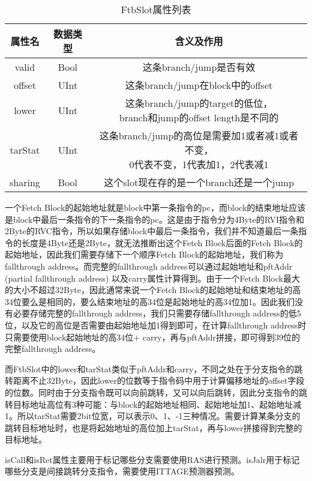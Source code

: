 \begin{table}[]
	\caption{FtbSlot属性列表}
	\label{tb:table2}
	\centering
	\begin{tabular}{|c|c|c|}
		\hline
		属性名   & 数据类型   & 含义及作用   \\ \hline
		valid & Bool & 这条branch/jump是否有效 \\ \hline
		offset & UInt & 这条branch/jump在block中的offset \\ \hline
		lower & UInt & \tabincell{c}{这条branch/jump的target的低位， \\ branch和jump的offset length是不同的} \\ \hline
		tarStat & UInt & \tabincell{c}{这条branch/jump的高位是需要加1或者减1或者不变， \\ 0代表不变，1代表加1，2代表减1} \\ \hline
		sharing & Bool & 这个slot现在存的是一个branch还是一个jump \\ \hline
	\end{tabular}
\end{table}

一个Fetch Block的起始地址就是block中第一条指令的pc，而block的结束地址应该是block中最后一条指令的下一条指令的pc。这是由于指令分为4Byte的RVI指令和2Byte的RVC指令，所以如果存储block中最后一条指令，我们并不知道最后一条指令的长度是4Byte还是2Byte，就无法推断出这个Fetch Block后面的Fetch Block的起始地址，因此我们需要存储下一个顺序Fetch Block的起始地址，我们称为fallthrough address。而完整的fallthrough address可以通过起始地址和pftAddr (partial fallthrough address) 以及carry属性计算得到。由于一个Fetch Block最大的大小不超过32Byte，因此通常来说一个Fetch Block的起始地址和结束地址的高34位要么是相同的，要么结束地址的高34位是起始地址的高34位加1。因此我们没有必要存储完整的fallthrough address，我们只需要存储fallthrough address的低5位，以及它的高位是否需要由起始地址加1得到即可，在计算fallthrough address时只需要使用block起始地址的高34位+ carry，再与pftAddr拼接，即可得到39位的完整fallthrough address。

而FtbSlot中的lower和tarStat类似于pftAddr和carry，不同之处在于分支指令的跳转距离不止32Byte，因此lower的位数等于指令码中用于计算偏移地址的offset字段的位数。同时由于分支指令既可以向前跳转，又可以向后跳转，因此分支指令的跳转目标地址高位有3种可能：与block的起始地址相同、起始地址加1、起始地址减1。所以tarStat需要2bit位宽，可以表示0、1、-1三种情况。需要计算某条分支的跳转目标地址时，也是将起始地址的高位加上tarStat，再与lower拼接得到完整的目标地址。

isCall和isRet属性主要用于标记哪些分支需要使用RAS进行预测。isJalr用于标记哪些分支是间接跳转分支指令，需要使用ITTAGE预测器预测。

